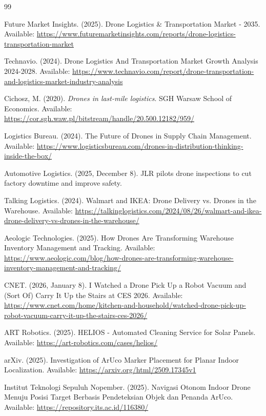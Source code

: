 \documentclass{EE-dyplom}
\begin{document}
\newpage
\begin{thebibliography}{99}

Future Market Insights. (2025). Drone Logistics \& Transportation Market - 2035. Available: \url{https://www.futuremarketinsights.com/reports/drone-logistics-transportation-market}

Technavio. (2024). Drone Logistics And Transportation Market Growth Analysis 2024-2028. Available: \url{https://www.technavio.com/report/drone-transportation-and-logistics-market-industry-analysis}

Cichosz, M. (2020). \textit{Drones in last-mile logistics}. SGH Warsaw School of Economics. Available: \url{https://cor.sgh.waw.pl/bitstream/handle/20.500.12182/959/}

Logistics Bureau. (2024). The Future of Drones in Supply Chain Management. Available: \url{https://www.logisticsbureau.com/drones-in-distribution-thinking-inside-the-box/}

Automotive Logistics. (2025, December 8). JLR pilots drone inspections to cut factory downtime and improve safety.

Talking Logistics. (2024). Walmart and IKEA: Drone Delivery vs. Drones in the Warehouse. Available: \url{https://talkinglogistics.com/2024/08/26/walmart-and-ikea-drone-delivery-vs-drones-in-the-warehouse/}

Aeologic Technologies. (2025). How Drones Are Transforming Warehouse Inventory Management and Tracking. Available: \url{https://www.aeologic.com/blog/how-drones-are-transforming-warehouse-inventory-management-and-tracking/}

CNET. (2026, January 8). I Watched a Drone Pick Up a Robot Vacuum and (Sort Of) Carry It Up the Stairs at CES 2026. Available: \url{https://www.cnet.com/home/kitchen-and-household/watched-drone-pick-up-robot-vacuum-carry-it-up-the-stairs-ces-2026/}

ART Robotics. (2025). HELIOS - Automated Cleaning Service for Solar Panels. Available: \url{https://art-robotics.com/cases/helios/}

arXiv. (2025). Investigation of ArUco Marker Placement for Planar Indoor Localization. Available: \url{https://arxiv.org/html/2509.17345v1}

Institut Teknologi Sepuluh Nopember. (2025). Navigasi Otonom Indoor Drone Menuju Posisi Target Berbasis Pendeteksian Objek dan Penanda ArUco. Available: \url{https://repository.its.ac.id/116380/}


\end{thebibliography}
\end{document}
